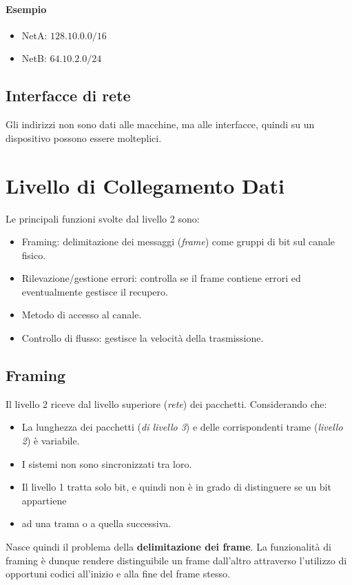 \documentclass[oneside,a4paper,11pt]{book}
\theoremstyle{italicstyle}
\theoremstyle{normStyle}
\begin{document}
\paragraph*{Esempio}
\begin{itemize}
  \item NetA: $128.10.0.0/16$
  \item NetB: $64.10.2.0/24$
\end{itemize}
\subsection{Interfacce di rete}
Gli indirizzi non sono dati alle macchine, ma alle interfacce, quindi su 
un dispositivo possono essere molteplici. 
\section{Livello di Collegamento Dati}
Le principali funzioni svolte dal livello 2 sono:
\begin{itemize}
  \item Framing: delimitazione dei messaggi (\textit{frame}) come gruppi 
  di bit sul canale fisico.
  \item Rilevazione/gestione errori: controlla se il frame contiene errori ed 
  eventualmente gestisce il recupero.
  \item Metodo di accesso al canale.
  \item Controllo di flusso: gestisce la velocità della trasmissione.
\end{itemize}
\subsection{Framing}
Il livello 2 riceve dal livello superiore (\textit{rete}) dei pacchetti.
Considerando che:
\begin{itemize}
  \item La lunghezza dei pacchetti (\textit{di livello 3}) e delle corrispondenti 
  trame (\textit{livello 2}) è variabile.
  \item I sistemi non sono sincronizzati tra loro.
  \item Il livello 1 tratta solo bit, e quindi non è in grado di distinguere se un bit appartiene 
  \item ad una trama o a quella successiva.
\end{itemize}
Nasce quindi il problema della \textbf{delimitazione dei frame}. La 
funzionalità di framing è dunque rendere distinguibile un frame dall'altro attraverso 
l'utilizzo di opportuni codici all'inizio e alla fine del frame stesso.
\end{document}
